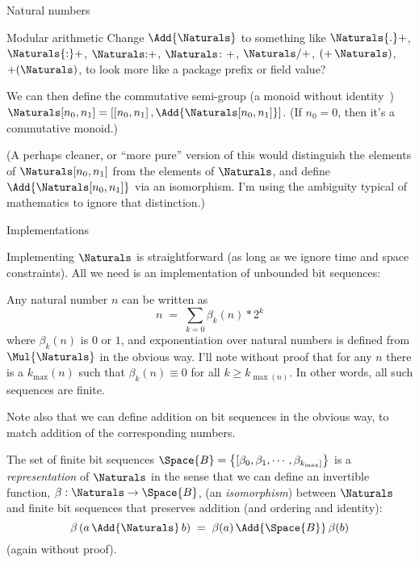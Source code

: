 \documentclass[12pt]{PalisadesLakesBook}
\begin{document}
\begin{plSection}{Natural numbers}
\begin{plSection}{Modular arithmetic}
\TODO Change $\Add{\Naturals}$ to something like
$\mathsf{\Naturals{.}+}$, 
$\mathsf{\Naturals{:}+}$, 
$\Naturals\mathsf{{:}+}$, 
$\Naturals\mathsf{{\colon}+}$, 
$\Naturals\mathsf{/+}$, 
$\mathsf{(+ \, \Naturals)}$, 
$\mathsf{+(\Naturals)}$, 
to look more like a package prefix or field value?

We can then define the commutative semi-group 
(a monoid without identity~\cite{wiki:Semigroup})
$
\Naturals[n_0,n_1] =
\left[ 
\left[ n_{0}, n_{1} \right], 
\Add{\Naturals[n_0,n_1]}
\right]
$.
(If $n_0=0$, then it's a commutative monoid.)

(A perhaps cleaner, or ``more pure'' version of this
would distinguish the elements of $\Naturals[n_0,n_1]$
from the elements of $\Naturals$,
and define $\Add{\Naturals[n_0,n_1]}$ via an isomorphism.
I'm using the ambiguity typical of mathematics to ignore that
distinction.)

\end{plSection}%
\begin{plSection}{Implementations}

Implementing $\Naturals$ is straightforward 
(as long as we ignore time and space constraints).
All we need is an implementation of unbounded bit sequences:

Any natural number $n$ can be written as
\begin{equation}
n \; = \; \sum_{k=0} \beta_{k}(n) * 2^{k}
\end{equation}
where $\beta_{k}(n)$ is $0$ or $1$,
and exponentiation over natural numbers is defined from
$\Mul{\Naturals}$ in the obvious way.
I'll note without proof that for any $n$ there is a 
$k_{\max}(n)$ such that $\beta_{k}(n) \equiv 0$ for all
$k \geq k_{\max(n)}$.
In other words, all such sequences are finite. 

Note also that we can define addition on bit sequences in the
obvious way, to match addition of the corresponding numbers.

The set of finite bit sequences 
$\Space{B} = \left\{[\beta_{0}, \beta_{1}, \cdots, 
\beta_{k_{\max}]} \right\}$
 is a 
\emph{representation} of $\Naturals$
in the sense that we can define an invertible function,
$\beta : \Naturals \rightarrow \Space{B}$,
(an \emph{isomorphism}) between $\Naturals$ and 
finite bit sequences
that preserves addition (and ordering and identity):
\begin{equation}
\beta \left( a \,\Add{\Naturals} \, b\right)
\;=\;
\beta ( a ) \, \Add{\Space{B}} \, \beta ( b )
\end{equation}
(again without proof).


\end{plSection}
\end{plSection}
\end{document}
